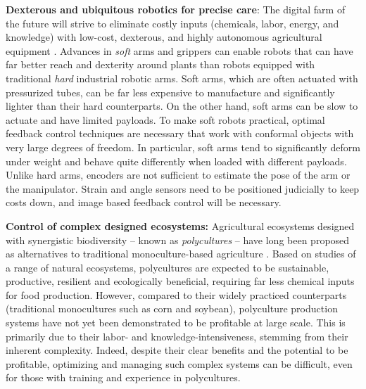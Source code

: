\textbf{Dexterous and ubiquitous robotics for precise care}​: The digital farm of the future will strive to eliminate costly inputs (chemicals, labor, energy, and knowledge) with low-cost, dexterous, and highly autonomous agricultural equipment \cite{pedersen2006agricultural}. Advances in \textit{soft} arms and grippers can enable robots that can have far better reach and dexterity around plants than robots equipped with traditional \textit{hard} industrial robotic arms. Soft arms, which are often actuated with pressurized tubes, can be far less expensive to manufacture and significantly lighter than their hard counterparts. On the other hand, soft arms can be slow to actuate and have limited payloads. To make soft robots practical, optimal feedback control techniques are necessary that work with conformal objects with very large degrees of freedom. In particular, soft arms tend to significantly deform under weight and behave quite differently when loaded with different payloads. Unlike hard arms, encoders are not sufficient to estimate the pose of the arm or the manipulator. Strain and angle sensors need to be positioned judicially to keep costs down, and image based feedback control will be necessary.  %

\textbf{Control of complex designed ecosystems:}   Agricultural ecosystems designed with synergistic biodiversity -- known as \textit{polycultures} -- have long been proposed as alternatives to traditional monoculture-based agriculture \cite{dewar2007perennial,lin2011resilience,thrupp2000linking,letourneau2011does}. Based on studies of a range of natural ecosystems, polycultures are expected to be sustainable, productive, resilient and ecologically beneficial, requiring far less chemical inputs for food production. However, compared to their widely practiced counterparts (traditional monocultures such as corn and soybean), polyculture production systems have not yet been demonstrated to be profitable at large scale. This is primarily %
due to their labor- and knowledge-intensiveness, stemming from their inherent complexity. Indeed, despite their clear benefits and the potential to be profitable, optimizing and managing such complex systems can be difficult, even for those with training and experience in polycultures. 

